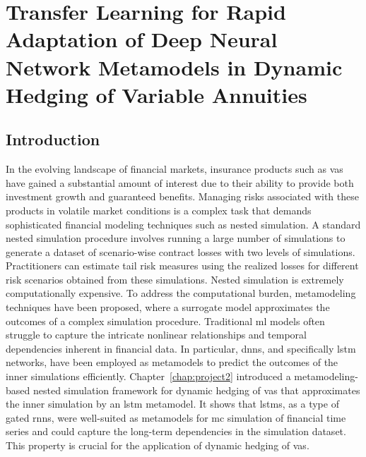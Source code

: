 \chapter{Transfer Learning for Rapid Adaptation of Deep Neural Network Metamodels in Dynamic Hedging of Variable Annuities} \label{chap:project3}

\section{Introduction}

In the evolving landscape of financial markets, insurance products such as \gls{va}s have gained a substantial amount of interest due to their ability to provide both investment growth and guaranteed benefits. 
Managing risks associated with these products in volatile market conditions is a complex task that demands sophisticated financial modeling techniques such as nested simulation.
A standard nested simulation procedure involves running a large number of simulations to generate a dataset of scenario-wise contract losses with two levels of simulations.
Practitioners can estimate tail risk measures using the realized losses for different risk scenarios obtained from these simulations.
Nested simulation is extremely computationally expensive.
To address the computational burden, metamodeling techniques have been proposed, where a surrogate model approximates the outcomes of a complex simulation procedure. 
Traditional \gls{ml} models often struggle to capture the intricate nonlinear relationships and temporal dependencies inherent in financial data.
In particular, \gls{dnn}s, and specifically \gls{lstm} networks, have been employed as metamodels to predict the outcomes of the inner simulations efficiently.
Chapter~\ref{chap:project2} introduced a metamodeling-based nested simulation framework for dynamic hedging of \gls{va}s that approximates the inner simulation by an \gls{lstm} metamodel.
It shows that \gls{lstm}s, as a type of gated \gls{rnn}s, were well-suited as metamodels for \gls{mc} simulation of financial time series and could capture the long-term dependencies in the simulation dataset.
This property is crucial for the application of dynamic hedging of \gls{va}s.


